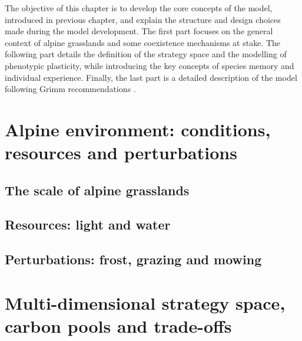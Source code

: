 %

The objective of this chapter is to develop the core concepts of the model, introduced in previous chapter, and explain the structure and design choices made during the model development. The first part focuses on the general context of alpine grasslands and some coexistence mechanisms at stake. The following part details the definition of the strategy space and the modelling of phenotypic plasticity, while introducing the key concepts of species memory and individual experience. Finally, the last part is a detailed description of the model following Grimm recommendations \cite{grimm_standard_2006}.

\chapter{Alpine environment: conditions, resources and perturbations}
\section{The scale of alpine grasslands}
\section{Resources: light and water}
\section{Perturbations: frost, grazing and mowing}

\chapter{Multi-dimensional strategy space, carbon pools and trade-offs}
